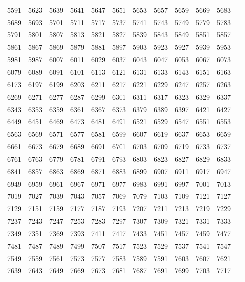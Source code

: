 \begin{table}
\begin{tabular}{llllllllllll}
5591 & 5623 & 5639 & 5641 & 5647 & 5651 & 5653 & 5657 & 5659 & 5669 & 5683 \\ 
5689 & 5693 & 5701 & 5711 & 5717 & 5737 & 5741 & 5743 & 5749 & 5779 & 5783 \\ 
5791 & 5801 & 5807 & 5813 & 5821 & 5827 & 5839 & 5843 & 5849 & 5851 & 5857 \\ 
5861 & 5867 & 5869 & 5879 & 5881 & 5897 & 5903 & 5923 & 5927 & 5939 & 5953 \\ 
5981 & 5987 & 6007 & 6011 & 6029 & 6037 & 6043 & 6047 & 6053 & 6067 & 6073 \\ 
6079 & 6089 & 6091 & 6101 & 6113 & 6121 & 6131 & 6133 & 6143 & 6151 & 6163 \\ 
6173 & 6197 & 6199 & 6203 & 6211 & 6217 & 6221 & 6229 & 6247 & 6257 & 6263 \\ 
6269 & 6271 & 6277 & 6287 & 6299 & 6301 & 6311 & 6317 & 6323 & 6329 & 6337 \\ 
6343 & 6353 & 6359 & 6361 & 6367 & 6373 & 6379 & 6389 & 6397 & 6421 & 6427 \\ 
6449 & 6451 & 6469 & 6473 & 6481 & 6491 & 6521 & 6529 & 6547 & 6551 & 6553 \\ 
6563 & 6569 & 6571 & 6577 & 6581 & 6599 & 6607 & 6619 & 6637 & 6653 & 6659 \\ 
6661 & 6673 & 6679 & 6689 & 6691 & 6701 & 6703 & 6709 & 6719 & 6733 & 6737 \\ 
6761 & 6763 & 6779 & 6781 & 6791 & 6793 & 6803 & 6823 & 6827 & 6829 & 6833 \\ 
6841 & 6857 & 6863 & 6869 & 6871 & 6883 & 6899 & 6907 & 6911 & 6917 & 6947 \\ 
6949 & 6959 & 6961 & 6967 & 6971 & 6977 & 6983 & 6991 & 6997 & 7001 & 7013 \\ 
7019 & 7027 & 7039 & 7043 & 7057 & 7069 & 7079 & 7103 & 7109 & 7121 & 7127 \\ 
7129 & 7151 & 7159 & 7177 & 7187 & 7193 & 7207 & 7211 & 7213 & 7219 & 7229 \\ 
7237 & 7243 & 7247 & 7253 & 7283 & 7297 & 7307 & 7309 & 7321 & 7331 & 7333 \\ 
7349 & 7351 & 7369 & 7393 & 7411 & 7417 & 7433 & 7451 & 7457 & 7459 & 7477 \\ 
7481 & 7487 & 7489 & 7499 & 7507 & 7517 & 7523 & 7529 & 7537 & 7541 & 7547 \\ 
7549 & 7559 & 7561 & 7573 & 7577 & 7583 & 7589 & 7591 & 7603 & 7607 & 7621 \\ 
7639 & 7643 & 7649 & 7669 & 7673 & 7681 & 7687 & 7691 & 7699 & 7703 & 7717 \\ 

\end{tabular}
\end{table}
